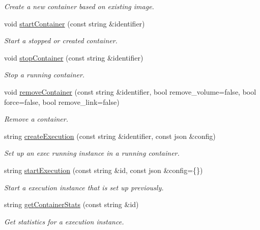 \begin{DoxyCompactItemize}
\begin{DoxyCompactList}\small\item\em Create a new container based on existing image. \end{DoxyCompactList}\item 
void \mbox{\hyperlink{classDockerClientpp_1_1DockerClient_af9a0df84fcdfb1d698e8bcca5207360e}{start\+Container}} (const string \&identifier)
\begin{DoxyCompactList}\small\item\em Start a stopped or created container. \end{DoxyCompactList}\item 
void \mbox{\hyperlink{classDockerClientpp_1_1DockerClient_a95a1b97085675199a5857515cde811b0}{stop\+Container}} (const string \&identifier)
\begin{DoxyCompactList}\small\item\em Stop a running container. \end{DoxyCompactList}\item 
void \mbox{\hyperlink{classDockerClientpp_1_1DockerClient_a17312c2ff3a2d059203c8ba5894215d7}{remove\+Container}} (const string \&identifier, bool remove\+\_\+volume=false, bool force=false, bool remove\+\_\+link=false)
\begin{DoxyCompactList}\small\item\em Remove a container. \end{DoxyCompactList}\item 
string \mbox{\hyperlink{classDockerClientpp_1_1DockerClient_a1b487be094a914698969338368a28f6a}{create\+Execution}} (const string \&identifier, const json \&config)
\begin{DoxyCompactList}\small\item\em Set up an exec running instance in a running container. \end{DoxyCompactList}\item 
string \mbox{\hyperlink{classDockerClientpp_1_1DockerClient_ac330f9f09ebd50ce63dbda0b55bbb6d7}{start\+Execution}} (const string \&id, const json \&config=\{\})
\begin{DoxyCompactList}\small\item\em Start a execution instance that is set up previously. \end{DoxyCompactList}\item 
string \mbox{\hyperlink{classDockerClientpp_1_1DockerClient_ab1952a285f13640ceb9b1d461fc5341d}{get\+Container\+Stats}} (const string \&id)
\begin{DoxyCompactList}\small\item\em Get statistics for a execution instance. \end{DoxyCompactList}\item 

\end{DoxyCompactItemize}
